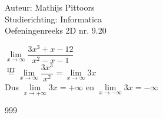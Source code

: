 \documentclass[a4paper]{article}
\newcommand{\llim}{\lim\limits}
\begin{document}
  
\noindent \large Auteur: Mathijs Pittoors \\
\noindent \large Studierichting: Informatica\\
\noindent \large Oefeningenreeks 2D nr. 9.20\\

\medskip

\normalsize

$\llim_{x \rightarrow \infty} \dfrac{3x^3+x-12}{x^2-x-1}$\\

$\overset{\mathrm{HT}}{=} \llim_{x \rightarrow \infty} \dfrac{3x^3}{x^2} = \llim_{x \rightarrow \infty} 3x$\\

Dus $\llim_{x \rightarrow + \infty} 3x = + \infty$ en $\llim_{x \rightarrow - \infty} 3x = - \infty$

\begin{thebibliography}{999}
\end{thebibliography}
\end{document}
